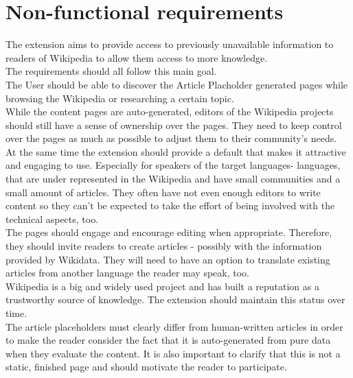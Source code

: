 \section{Non-functional requirements}

The extension aims to provide access to previously unavailable information to readers of Wikipedia to allow them access to more knowledge. \\
The requirements should all follow this main goal. \\
The User should be able to discover the Article Placholder generated pages while browsing the Wikipedia or researching a certain topic. \\
While the content pages are auto-generated, editors of the Wikipedia projects should still have a sense of ownership over the pages. They need to keep control over the pages as much as possible to adjust them to their community's needs.  \\
At the same time the extension should provide a default that makes it attractive and engaging to use. Especially for speakers of the target languages- languages, that are under represented in the Wikipedia and have small communities and a small amount of articles. They often have not even enough editors to write content so they can't be expected to take the effort of being involved with the technical aspects, too.  \\
The pages should engage and encourage editing when appropriate. Therefore, they should invite readers to create articles - possibly with the information provided by Wikidata. They will need to have an option to translate existing articles from another language the reader may speak, too. \\
Wikipedia is a big and widely used project and has built a reputation as a trustworthy source of knowledge. The extension should maintain this status over time. \\
The article placeholders must clearly differ from human-written articles in order to make the reader consider the fact that it is auto-generated from pure data when they evaluate the content. It is also important to clarify that this is not a static, finished page and should motivate the reader to participate. \\
